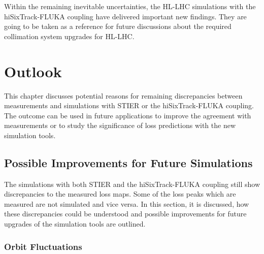 Within the remaining inevitable uncertainties, the HL-LHC simulations with the hiSixTrack-FLUKA coupling have delivered important new findings. They are going to be taken as a reference for future discussions about the required collimation system upgrades for HL-LHC.











\chapter{Outlook} \label{chap:outlook}

This chapter discusses potential reasons for remaining discrepancies between measurements and simulations with STIER or the hiSixTrack-FLUKA coupling. The outcome can be used in future applications to improve the agreement with measurements or to study the significance of loss predictions with the new simulation tools.


\section{Possible Improvements for Future Simulations} \label{chap:impr}

The simulations with both STIER and the hiSixTrack-FLUKA coupling still show discrepancies to the measured loss maps. Some of the loss peaks which are measured are not simulated and vice versa. In this section, it is discussed, how these discrepancies could be understood and possible improvements for future upgrades of the simulation tools are outlined.

\subsection{Orbit Fluctuations}



